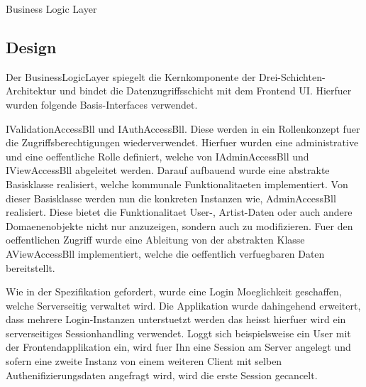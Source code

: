 \begin{section}{Business Logic Layer}

\subsection{Design}

Der BusinessLogicLayer spiegelt die Kernkomponente der Drei-Schichten-Architektur und bindet die Datenzugriffsschicht mit dem Frontend UI. Hierfuer wurden folgende Basis-Interfaces verwendet.


IValidationAccessBll und IAuthAccessBll. Diese werden in ein Rollenkonzept fuer die Zugriffsberechtigungen wiederverwendet. Hierfuer wurden eine administrative und eine oeffentliche Rolle definiert, welche von IAdminAccessBll und IViewAccessBll abgeleitet werden. Darauf aufbauend wurde eine abstrakte Basisklasse realisiert, welche kommunale Funktionalitaeten implementiert. Von dieser Basisklasse werden nun die konkreten Instanzen wie, AdminAccessBll realisiert. Diese bietet die Funktionalitaet User-, Artist-Daten oder auch andere Domaenenobjekte nicht nur anzuzeigen, sondern auch zu modifizieren. Fuer den oeffentlichen Zugriff wurde eine Ableitung von der abstrakten Klasse AViewAccessBll implementiert, welche die oeffentlich verfuegbaren Daten bereitstellt.

Wie in der Spezifikation gefordert, wurde eine Login Moeglichkeit geschaffen, welche Serverseitig verwaltet wird. Die Applikation wurde dahingehend erweitert, dass mehrere Login-Instanzen unterstuetzt werden\; das heisst hierfuer wird ein serverseitiges Sessionhandling verwendet. Loggt sich beispielsweise ein User mit der Frontendapplikation ein, wird fuer Ihn eine Session am Server angelegt und sofern eine zweite Instanz von einem weiteren Client mit selben Authenifizierungsdaten angefragt wird, wird die erste Session gecancelt.





\end{section}
